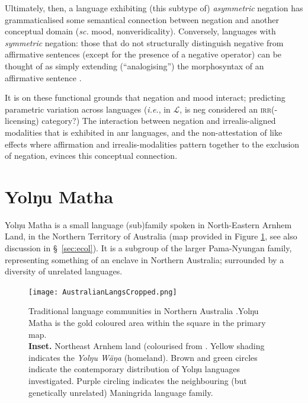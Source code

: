 Ultimately, then, a language exhibiting (this subtype of) \textit{asymmetric} negation has grammaticalised some semantical connection between negation and another conceptual domain (\textit{sc.} mood, nonveridicality). Conversely, languages with \textit{symmetric} negation: those that do not structurally distinguish negative from affirmative sentences (except for the presence of a negative operator) can be thought of as simply extending (``analogising'') the morphosyntax of an affirmative sentence \citep[201--2]{Miestamo2005}.


It is on these functional grounds that negation and mood interact; predicting parametric variation across languages (\textit{i.e.}, in $ \mathcal L $, is \gls{neg} considered an \textsc{irr}(-licensing) category?) The interaction between negation and irrealis-aligned modalities that is exhibited in \acrshort{anr} languages, and the non-attestation of like effects where affirmation and irrealis-modalities pattern together to the exclusion of negation, evinces this conceptual connection.




\section{Yolŋu Matha}\label{sec:yol-bkgrd}

Yolŋu Matha is a small language (sub)family spoken in North-Eastern Arnhem Land, in the Northern Territory of Australia (map provided in Figure \ref{map}, see also discussion in \S~\ref{sec:ecol}). It is a subgroup of the larger Pama-Nyungan family, representing something of an enclave in Northern Australia; surrounded by a diversity of unrelated languages.

\begin{figure}[h]
	\centering\caption[\textsc{map.} Languages of (eastern) Arnhem Land]{Traditional language communities in Northern Australia \citep{Horton1996}.Yolŋu Matha is the gold coloured area within the square in the primary map.\\\textbf{Inset. }Northeast Arnhem land (colourised from \citealt[2]{Wilkinson1991}. Yellow shading indicates the \textit{Yolŋu Wäŋa} (homeland). Brown and green circles indicate the contemporary distribution of Yolŋu languages investigated. Purple circling indicates the neighbouring (but genetically unrelated) Maningrida language family.}	\texttt{[image: AustralianLangsCropped.png]}\label{map}
\end{figure}


